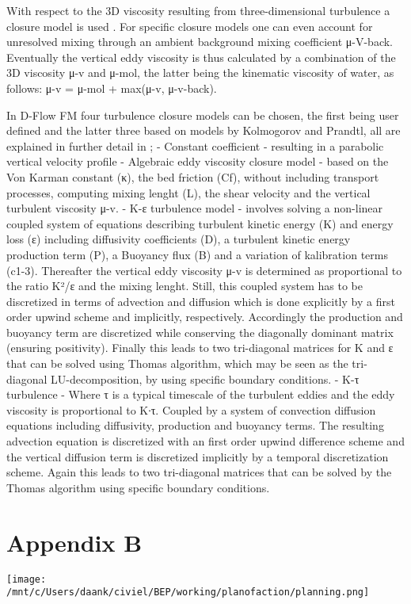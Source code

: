 With respect to the 3D viscosity resulting from three-dimensional
turbulence a closure model is used \citep[p.26]{DFlowTechMan}. For
specific closure models one can even account for unresolved mixing
through an ambient background mixing coefficient μ-V-back. Eventually
the vertical eddy viscosity is thus calculated by a combination of the
3D viscosity μ-v and μ-mol, the latter being the kinematic viscosity of
water, as follows: μ-v = μ-mol + max(μ-v, μ-v-back).

In D-Flow FM four turbulence closure models can be chosen, the first
being user defined and the latter three based on models by Kolmogorov
and Prandtl, all are explained in further detail in
\citep[p.112-120]{DFlowTechMan}; - Constant coefficient - resulting in a
parabolic vertical velocity profile - Algebraic eddy viscosity closure
model - based on the Von Karman constant (κ), the bed friction (Cf),
without including transport processes, computing mixing lenght (L), the
shear velocity and the vertical turbulent viscosity μ-v. - Κ-ε
turbulence model - involves solving a non-linear coupled system of
equations describing turbulent kinetic energy (Κ) and energy loss (ε)
including diffusivity coefficients (D), a turbulent kinetic energy
production term (P), a Buoyancy flux (B) and a variation of kalibration
terms (c1-3). Thereafter the vertical eddy viscosity μ-v is determined
as proportional to the ratio Κ²/ε and the mixing lenght. Still, this
coupled system has to be discretized in terms of advection and diffusion
which is done explicitly by a first order upwind scheme and implicitly,
respectively. Accordingly the production and buoyancy term are
discretized while conserving the diagonally dominant matrix (ensuring
positivity). Finally this leads to two tri-diagonal matrices for Κ and ε
that can be solved using Thomas algorithm, which may be seen as the
tri-diagonal LU-decomposition, by using specific boundary conditions. -
Κ-τ turbulence - Where τ is a typical timescale of the turbulent eddies
and the eddy viscosity is proportional to Κ∙τ. Coupled by a system of
convection diffusion equations including diffusivity, production and
buoyancy terms. The resulting advection equation is discretized with an
first order upwind difference scheme and the vertical diffusion term is
discretized implicitly by a temporal discretization scheme. Again this
leads to two tri-diagonal matrices that can be solved by the Thomas
algorithm using specific boundary conditions.

\chapter{Appendix B}\label{appendix-b}
\texttt{[image: /mnt/c/Users/daank/civiel/BEP/working/planofaction/planning.png]}
